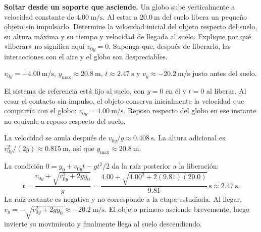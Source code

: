 \begin{ejercicio}
\textbf{Soltar desde un soporte que asciende.} Un globo sube verticalmente a velocidad constante de \(\SI{4.00}{\meter\per\second}\). Al estar a \(\SI{20.0}{\meter}\) del suelo libera un pequeño objeto sin impulsarlo. Determine la velocidad inicial del objeto respecto del suelo, su altura máxima y su tiempo y velocidad de llegada al suelo. Explique por qué «liberar» no significa aquí \(v_{0y}=0\). Suponga que, después de liberarlo, las interacciones con el aire y el globo son despreciables.
\end{ejercicio}
\begin{respuesta}
\(v_{0y}=+\SI{4.00}{\meter\per\second}\), \(y_{\max}\approx\SI{20.8}{\meter}\), \(t\approx\SI{2.47}{\second}\) y \(v_y\approx-\SI{20.2}{\meter\per\second}\) justo antes del suelo.
\end{respuesta}
\begin{explicacion}
El sistema de referencia está fijo al suelo, con \(y=0\) en él y \(t=0\) al liberar. Al cesar el contacto sin impulso, el objeto conserva inicialmente la velocidad que compartía con el globo: \(v_{0y}=\SI{4.00}{\meter\per\second}\). Reposo respecto del globo en ese instante no equivale a reposo respecto del suelo.

La velocidad se anula después de \(v_{0y}/g\approx\SI{0.408}{\second}\). La altura adicional es \(v_{0y}^2/(2g)\approx\SI{0.815}{\meter}\), así que \(y_{\max}\approx\SI{20.8}{\meter}\).

La condición \(0=y_0+v_{0y}t-gt^2/2\) da la raíz posterior a la liberación:
\[ t=\frac{v_{0y}+\sqrt{v_{0y}^2+2gy_0}}{g}=\frac{4.00+\sqrt{4.00^2+2(9.81)(20.0)}}{9.81}\,\si{\second}\approx\SI{2.47}{\second}. \]
La raíz restante es negativa y no corresponde a la etapa estudiada. Al llegar, \(v_y=-\sqrt{v_{0y}^2+2gy_0}\approx-\SI{20.2}{\meter\per\second}\). El objeto primero asciende brevemente, luego invierte su movimiento y finalmente llega al suelo descendiendo.
\end{explicacion}

